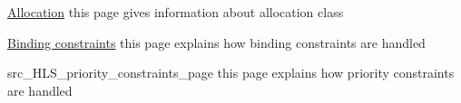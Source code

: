 
\begin{DoxyItemize}
\item \hyperlink{src_HLS_allocation_page}{Allocation} this page gives information about allocation class
\item \hyperlink{src_HLS_binding_constraints_page}{Binding constraints} this page explains how binding constraints are handled
\item src\+\_\+\+H\+L\+S\+\_\+priority\+\_\+constraints\+\_\+page this page explains how priority constraints are handled 
\end{DoxyItemize}